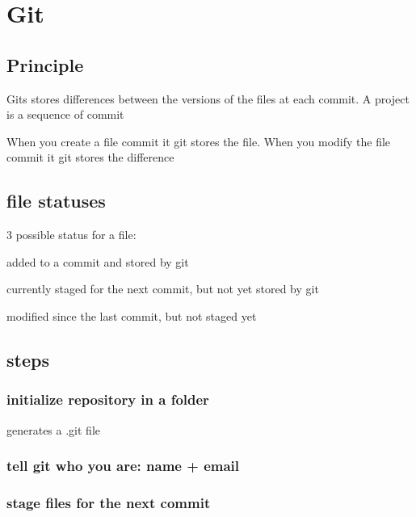 \chapter{Git}

\section{Principle}

	Gits stores differences between the versions of the files at each commit. A project is a sequence of commit


	When you create a file commit it git stores the file. When you modify the file commit it git stores the difference 



\section{file statuses}

 
 	3 possible status for a file:

	 added to a commit and stored by git

	 currently staged for the next commit, but not yet stored by git

	 modified since the last commit, but not staged yet


\section{steps}

	\subsection{initialize repository in a folder}
	

		 generates a .git file 

	\subsection{tell git who you are: name + email}
	
	

	\subsection{stage files for the next commit}

